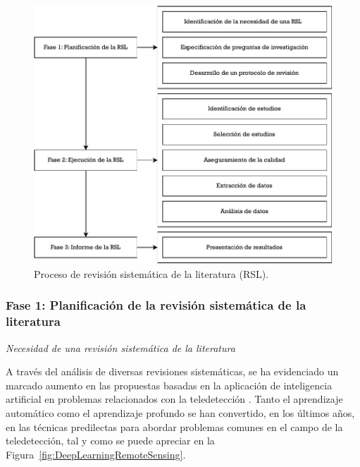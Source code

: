 \begin{figure}[H]
    \begin{center}
    \includegraphics[width=1\textwidth]{Images/RSL.pdf}
    \end{center}
    \caption{Proceso de revisión sistemática de la literatura (RSL).}
     \label{fig:RSL}
\end{figure}

\subsubsection{Fase 1: Planificación de la revisión sistemática de la literatura}

\textit{Necesidad de una revisión sistemática de la literatura}

A través del análisis de diversas revisiones sistemáticas, se ha evidenciado un marcado aumento en las propuestas basadas en la aplicación de inteligencia artificial en problemas relacionados con la teledetección \cite{zhu2017deep, ma2019deep, yuan2020deep}. Tanto el aprendizaje automático como el aprendizaje profundo se han convertido, en los últimos años, en las técnicas predilectas para abordar problemas comunes en el campo de la teledetección, tal y como se puede apreciar en la Figura~\ref{fig:DeepLearningRemoteSensing}.

